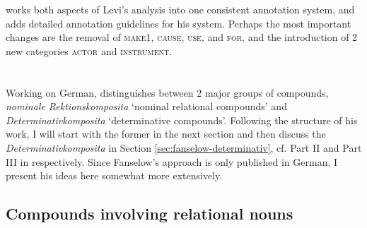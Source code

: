 \citeauthor{Oseaghdha:2008} works both aspects of Levi's analysis into
one consistent annotation system, and adds detailed annotation
guidelines for his system. Perhaps the most important changes are the
removal of \textsc{make1}, \textsc{cause}, \textsc{use}, and \textsc{for}, and the introduction of 2 new
categories \textsc{actor} and \textsc{instrument}. 





\section{\citet{Fanselow:1981}}
\label{sec:fanselow_1981}

Working on German, \citet{Fanselow:1981} distinguishes between 2 major groups of
compounds, \emph{nominale Rektionskomposita} `nominal relational compounds' and 
\emph{Determinativkomposita} `determinative compounds'. 
% 
Following the structure of his work, I
will start with the former in the next section and then discuss the
\emph{Determinativkomposita} in Section
\ref{sec:fanselow-determinativ}, cf. Part II and Part III in \citet{Fanselow:1981} respectively. Since Fanselow's approach is only
published in German, I present his ideas here somewhat more extensively.


\subsection{Compounds involving relational nouns}
\label{sec:fanselow_relational_nouns}

